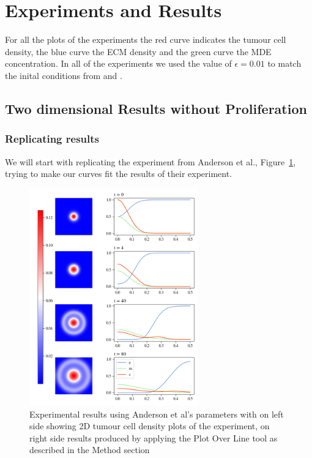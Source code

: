 

\section{Experiments and Results}

For all the plots of the experiments the red curve indicates the tumour cell density, the blue curve the ECM density and the green curve the MDE concentration. In all of the experiments we used the value of $\epsilon = 0.01$ to match the inital conditions from \cite{anderson_mathematical_2000} and \cite{Kolev2010}. \newline 


\subsection{Two dimensional Results without Proliferation}
\subsubsection{Replicating results}
We will start with replicating the experiment from  Anderson et al.\cite{anderson_mathematical_2000}, Figure~\ref{fig:unadjsuted_replication}, trying to make our curves fit the results of their experiment. 

\begin{figure}
    \centering
    \includegraphics[width=0.65\textwidth]{resources/images/first_replication_results.png}
    \caption{Experimental results using Anderson et al's parameters with on left side showing 2D tumour cell density plots of the experiment, on right side results produced by applying the Plot Over Line tool as described in the Method section}
    \label{fig:unadjsuted_replication}
\end{figure}

